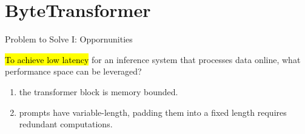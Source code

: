 \section{ByteTransformer}

\begin{frame}{Problem to Solve I: Oppornunities}
    \footnotesize{
        \hl{To achieve low latency} for an inference system that processes data online, what performance space can be leveraged?
        \begin{enumerate}
            \item the transformer block is memory bounded.
            \item prompts have variable-length, padding them into a fixed length requires redundant computations.
        \end{enumerate}
    }
\end{frame}

